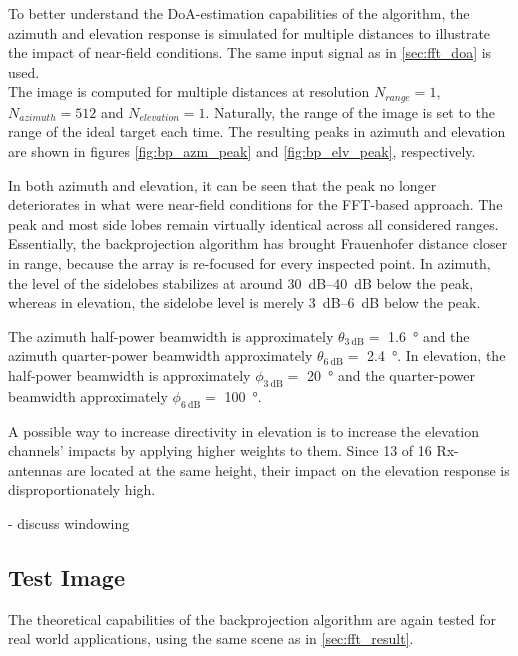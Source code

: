 To better understand the DoA-estimation capabilities of the algorithm,
the azimuth and elevation response is simulated for multiple distances to illustrate the impact of near-field conditions.
The same input signal as in \autoref{sec:fft_doa} is used.
\\

The image is computed for multiple distances at resolution
$N_{range} = 1$, ${N_{azimuth} = 512}$ and $N_{elevation} = 1$.
Naturally, the range of the image is set to the range of the ideal target each time.
The resulting peaks in azimuth and elevation are shown in figures \ref{fig:bp_azm_peak} and \ref{fig:bp_elv_peak}, respectively.


In both azimuth and elevation, it can be seen that the peak no longer deteriorates in what were near-field conditions for the FFT-based approach.
The peak and most side lobes remain virtually identical across all considered ranges.
Essentially, the backprojection algorithm has brought Frauenhofer distance closer in range,
because the array is re-focused for every inspected point.
In azimuth, the level of the sidelobes stabilizes at around \SIrange{30}{40}{\dB} below the peak,
whereas in elevation, the sidelobe level is merely \SIrange{3}{6}{\dB} below the peak.

The azimuth half-power beamwidth is approximately $\theta_{\SI{3}{\dB}}=$ \SI{1.6}{\degree} and
the azimuth quarter-power beamwidth approximately $\theta_{\SI{6}{\dB}}=$ \SI{2.4}{\degree}.
In elevation, the half-power beamwidth is approximately $\phi_{\SI{3}{\dB}}=$ \SI{20}{\degree} and
the quarter-power beamwidth approximately $\phi_{\SI{6}{\dB}}=$ \SI{100}{\degree}.


A possible way to increase directivity in elevation is to increase the elevation channels' impacts by applying higher weights to them.
Since 13 of 16 Rx-antennas are located at the same height, their impact on the elevation response is disproportionately high.


- discuss windowing


\newpage
\subsection{Test Image}
The theoretical capabilities of the backprojection algorithm are again tested for real world applications,
using the same scene as in \autoref{sec:fft_result}.

